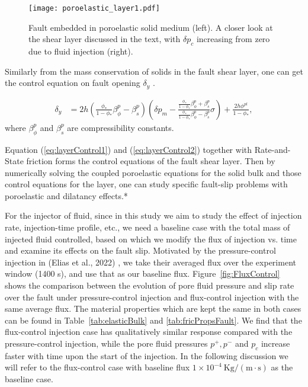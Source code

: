 \begin{figure}[hbtp]
    \centering
    \texttt{[image: poroelastic\_layer1.pdf]}
    \caption{Fault embedded in poroelastic solid medium (left).
    A closer look at the shear layer discussed in the text, with $\delta p_c$ increasing from zero due to fluid injection (right).}
    \label{fig:poroshear1}
\end{figure}

Similarly from the mass conservation of solids in the fault shear layer, 
one can get the control equation on fault opening $\delta_y$ \cite{Elias_Shengduo_2022}.

\begin{align}
    \delta_y &= 2h \left(\frac{\phi_*}{1-\phi_*}\beta_\phi^p-\beta_s^p\right)
    \left(
    \delta p_m - \frac{\frac{\phi_*}{1-\phi_*}\beta_\phi^p+\beta_s^p}{\frac{\phi_*}{1-\phi_*}\beta_\phi^p-\beta_s^p}\sigma
    \right)+\frac{2h\phi^{pl}}{1-\phi_*}, 
    \label{eq:layerControl2}
\end{align}
where $\beta_\phi^p$ and $\beta_s^p$ are compressibility constants. 

Equation (\ref{eq:layerControl1}) and (\ref{eq:layerControl2}) together with Rate-and-State friction forms the control equations of the fault shear layer. 
Then by numerically solving the coupled poroelastic equations for the solid bulk and those control equations for the layer, 
one can study specific fault-slip problems with poroelastic and dilatancy effects.*

For the injector of fluid, 
since in this study we aim to study the effect of injection rate, 
injection-time profile, etc., 
we need a baseline case with the total mass of injected fluid controlled, 
based on which we modify the flux of injection vs. time and examine its effects on the fault slip. 
Motivated by the pressure-control injection in (Elias et al., 2022) \cite{Elias_Shengduo_2022}, 
we take their averaged flux over the experiment window (1400 s), 
and use that as our baseline flux. 
Figure~\ref{fig:FluxControl} shows the comparison between the evolution of pore fluid pressure and slip rate over the fault under pressure-control injection and flux-control injection with the same average flux. 
The material properties which are kept the same in both cases can be found in Table~\ref{tab:elasticBulk} and \ref{tab:fricPropsFault}. 
We find that the flux-control injection case has qualitatively similar response compared with the pressure-control injection, 
while the pore fluid pressures $p^+, p^-$ and $p_c$ increase faster with time upon the start of the injection. 
In the following discussion we will refer to the flux-control case with baseline flux $1\times10^{-4}\ \mathrm{Kg/(m\cdot s)}$ as the baseline case. 

